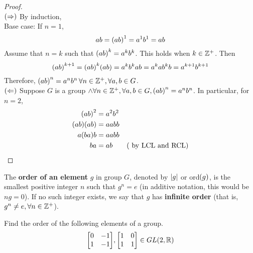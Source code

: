 \begin{proof} \phantom{blank} \\
    $\qty(\Rightarrow)$ By induction, \\
    Base case: If $n = 1$,
    \[ ab = \qty(ab)^1 = a^1b^1 = ab \]
    Assume that $n = k$ such that $\qty(ab)^k = a^kb^k$. This holds when $k \in \mathbb{Z}^+$. Then
    \[ \qty(ab)^{k+1} = \qty(ab)^k \qty(ab) = a^kb^k ab = a^kab^kb = a^{k+1}b^{k+1} \]
     Therefore, $\qty(ab)^n = a^nb^n \, \forall n \in \mathbb{Z}^+, \forall a, b \in G$. \qedsymbol \\
    $\qty(\Leftarrow)$ Suppose $G$ is a group $\land \forall n \in \mathbb{Z}^+, \forall a, b \in G, \qty(ab)^n = a^nb^n$. In particular, for $n = 2$,
    \begin{align*}
        \qty(ab)^2 &= a^2b^2 \\
        \qty(ab) \qty(ab) &= aabb \\
        a \qty(ba) b &= aabb \\
        ba &= ab \hspace{2em} \text{( by LCL and RCL)}
    \end{align*}
\end{proof}

\begin{definition}
    The \textbf{order of an element} $g$ in group $G$, denoted by $\qty|g|$ or ord$\qty(g)$, is the smallest positive integer $n$ such that $g^n = e$ (in additive notation, this would be $ng = 0$). If no such integer exists, we say that $g$ has \textbf{infinite order} (that is, $g^n \neq e, \forall n \in \mathbb{Z}^+$).
\end{definition}

\begin{exercise}
    Find the order of the following elements of a group.
    \[ \mqty[0 & -1 \\ 1 & -1], \mqty[1 & 0 \\ 1 & 1] \in GL\qty(2, \R) \]
\end{exercise}

